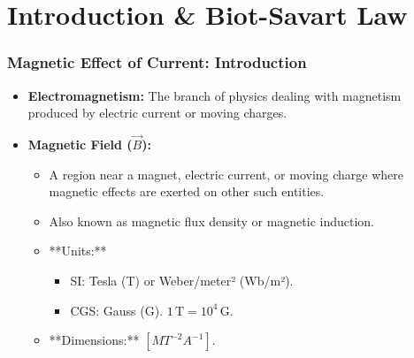 
\section{Introduction & Biot-Savart Law}

\transfade[duration=0.5]

\begin{frame}[t]
    \frametitle{\textcolor{deepnavy}{\textbf{Magnetic Effect of Current: Introduction}}}
    \renewcommand{\familydefault}{\rmdefault}
    \small %

    \begin{itemize}
      \item<+-> \textbf{Electromagnetism:} The branch of physics dealing with magnetism produced by electric current or moving charges.

    \vspace{1em}

      \item<+-> \textbf{Magnetic Field ($\vec{B}$):}
        \begin{itemize}
              \item A region near a magnet, electric current, or moving charge where magnetic effects are exerted on other such entities.
              \item Also known as magnetic flux density or magnetic induction.
              \item **Units:**
                \begin{itemize}
                      \item SI: Tesla (T) or Weber/meter² (Wb/m²).
                    \item CGS: Gauss (G).   $1 \, \text{T} = 10^4 \, \text{G}$.
                \end{itemize}
              \item **Dimensions:** $[MT^{-2}A^{-1}]$.
        \end{itemize}

    \vspace{1em}


\end{itemize}
\end{frame}
